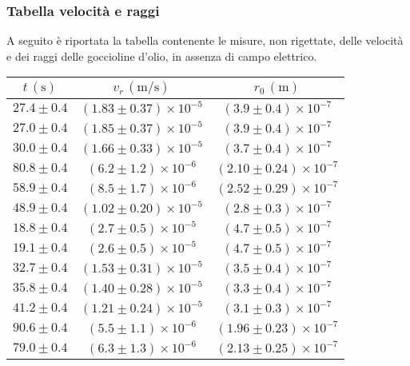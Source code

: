 \subsubsection{Tabella velocità e raggi}
A seguito è riportata la tabella contenente le misure, non rigettate, delle velocità e dei raggi delle goccioline d'olio, in assenza di campo elettrico.        \renewcommand{\arraystretch}{1.3} %
        \begin{longtable}[C]{|c|c|c|}
            \hline
            $t \, (\mathrm{s})$ & $v_r \, (\mathrm{m/s})$ & $r_0 \, (\mathrm{m})$ \\
            \hline
            $27.4 \pm 0.4$ & $(1.83 \pm 0.37) \times 10^{-5}$ & $(3.9 \pm 0.4) \times 10^{-7}$ \\
            \hline
            $27.0 \pm 0.4$ & $(1.85 \pm 0.37) \times 10^{-5}$ & $(3.9 \pm 0.4) \times 10^{-7}$ \\
            \hline
            $30.0 \pm 0.4$ & $(1.66 \pm 0.33) \times 10^{-5}$ & $(3.7 \pm 0.4) \times 10^{-7}$ \\
            \hline
            $80.8 \pm 0.4$ & $(6.2 \pm 1.2) \times 10^{-6}$ & $(2.10 \pm 0.24) \times 10^{-7}$ \\
            \hline
            $58.9 \pm 0.4$ & $(8.5 \pm 1.7) \times 10^{-6}$ & $(2.52 \pm 0.29) \times 10^{-7}$ \\
            \hline
            $48.9 \pm 0.4$ & $(1.02 \pm 0.20) \times 10^{-5}$ & $(2.8 \pm 0.3) \times 10^{-7}$ \\
            \hline
            $18.8 \pm 0.4$ & $(2.7 \pm 0.5) \times 10^{-5}$ & $(4.7 \pm 0.5) \times 10^{-7}$ \\
            \hline
            $19.1 \pm 0.4$ & $(2.6 \pm 0.5) \times 10^{-5}$ & $(4.7 \pm 0.5) \times 10^{-7}$ \\
            \hline
            $32.7 \pm 0.4$ & $(1.53 \pm 0.31) \times 10^{-5}$ & $(3.5 \pm 0.4) \times 10^{-7}$ \\
            \hline
            $35.8 \pm 0.4$ & $(1.40 \pm 0.28) \times 10^{-5}$ & $(3.3 \pm 0.4) \times 10^{-7}$ \\
            \hline
            $41.2 \pm 0.4$ & $(1.21 \pm 0.24) \times 10^{-5}$ & $(3.1 \pm 0.3) \times 10^{-7}$ \\
            \hline
            $90.6 \pm 0.4$ & $(5.5 \pm 1.1) \times 10^{-6}$ & $(1.96 \pm 0.23) \times 10^{-7}$ \\
            \hline
            $79.0 \pm 0.4$ & $(6.3 \pm 1.3) \times 10^{-6}$ & $(2.13 \pm 0.25) \times 10^{-7}$ \\

\end{longtable}
